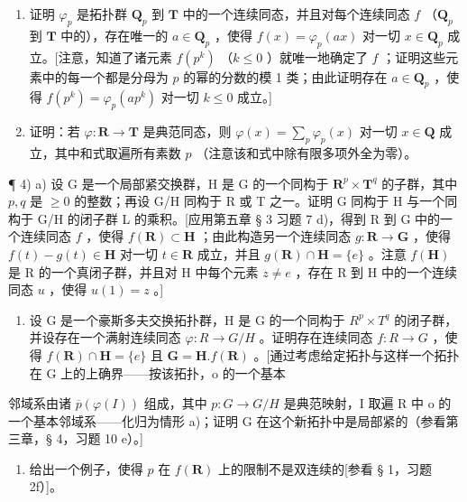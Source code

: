 \begin{enumerate}
\def\labelenumi{\alph{enumi})}
\tightlist
\item
  证明 \(\varphi_p\) 是拓扑群 \(\mathbf{Q}_p\) 到 \(\mathbf{T}\) 中的一个连续同态，并且对每个连续同态 \(f\) （\(\mathbf{Q}_p\) 到 \(\mathbf{T}\) 中的），存在唯一的 \(a \in \mathbf{Q}_p\) ，使得 \(f(x) = \varphi_p(ax)\) 对一切 \(x \in \mathbf{Q}_p\) 成立。{[}注意，知道了诸元素 \(f(p^k)\) （\(k \leqslant 0\) ）就唯一地确定了 \(f\) ；证明这些元素中的每一个都是分母为 \(p\) 的幂的分数的模 1 类；由此证明存在 \(a \in \mathbf{Q}_p\) ，使得 \(f(p^k) = \varphi_p(ap^k)\) 对一切 \(k \leqslant 0\) 成立。{]}\\
\item
  证明：若 \(\varphi: \mathbf{R} \to \mathbf{T}\) 是典范同态，则 \(\varphi(x) = \sum_{p} \varphi_p(x)\) 对一切 \(x \in \mathbf{Q}\) 成立，其中和式取遍所有素数 \(p\) （注意该和式中除有限多项外全为零）。
\end{enumerate}

¶ 4) a) 设 G 是一个局部紧交换群，H 是 G 的一个同构于 \(\mathbf{R}^{p} \times \mathbf{T}^{q}\) 的子群，其中 \(p, q\) 是 \(\geqslant 0\) 的整数；再设 G/H 同构于 R 或 T 之一。证明 G 同构于 H 与一个同构于 G/H 的闭子群 L 的乘积。{[}应用第五章 § 3 习题 7 d)，得到 R 到 G 中的一个连续同态 \(f\) ，使得 \(f(\mathbf{R}) \subset \mathbf{H}\) ；由此构造另一个连续同态 \(g: \mathbf{R} \to \mathbf{G}\) ，使得 \(f(t) - g(t) \in \mathbf{H}\) 对一切 \(t \in \mathbf{R}\) 成立，并且 \(g(\mathbf{R}) \cap \mathbf{H} = \{e\}\) 。注意 \(f(\mathbf{H})\) 是 R 的一个真闭子群，并且对 H 中每个元素 \(z \neq e\) ，存在 R 到 H 中的一个连续同态 \(u\) ，使得 \(u(1) = z\) 。{]}

\begin{enumerate}
\def\labelenumi{\alph{enumi})}
\setcounter{enumi}{1}
\tightlist
\item
  设 G 是一个豪斯多夫交换拓扑群，H 是 G 的一个同构于 \(R^{p} \times T^{q}\) 的闭子群，并设存在一个满射连续同态 \(\varphi: R \to G/H\) 。证明存在连续同态 \(f: R \to G\) ，使得 \(f(\mathbf{R}) \cap \mathbf{H} = \{e\}\) 且 \(\mathbf{G} = \mathbf{H}. f(\mathbf{R})\) 。{[}通过考虑给定拓扑与这样一个拓扑在 G 上的上确界——按该拓扑，o 的一个基本
\end{enumerate}

邻域系由诸 \(\overline{p}(\varphi(I))\) 组成，其中 \(p:G\to G/H\) 是典范映射，I 取遍 R 中 o 的一个基本邻域系——化归为情形 a)；证明 G 在这个新拓扑中是局部紧的（参看第三章，§ 4，习题 10 e）。{]}

\begin{enumerate}
\def\labelenumi{\alph{enumi})}
\setcounter{enumi}{2}
\tightlist
\item
  给出一个例子，使得 \(p\) 在 \(f(\mathbf{R})\) 上的限制不是双连续的{[}参看 § 1，习题 2f）{]}。
\end{enumerate}

